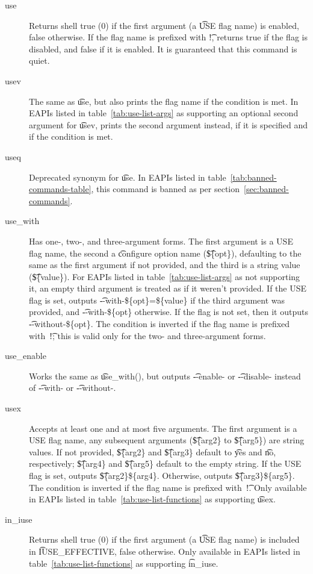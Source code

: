 \begin{description}
\item[use] Returns shell true (0) if the first argument (a \t{USE} flag name) is enabled, false
    otherwise.  If the flag name is prefixed with \t{!}, returns true if the flag is disabled, and
    false if it is enabled. It is guaranteed that this command is quiet.
\item[usev]  The same as \t{use}, but also prints the flag name if the condition
    is met. In EAPIs listed in table~\ref{tab:use-list-args} as supporting an optional second
    argument for \t{usev}, prints the second argument instead, if it is specified and if the
    condition is met.
\item[useq] Deprecated synonym for \t{use}.
    In EAPIs listed in table~\ref{tab:banned-commands-table}, this command is banned as per
    section~\ref{sec:banned-commands}.
\item[use_with]  Has one-, two-, and three-argument forms. The first
    argument is a USE flag name, the second a \t{configure} option name (\t{\$\{opt\}}), defaulting
    to the same as the first argument if not provided, and the third is a string value
    (\t{\$\{value\}}). For EAPIs listed in table~\ref{tab:use-list-args} as not supporting it,
    an empty third argument is treated as if it weren't provided. If the USE flag is set, outputs
    \t{-{}-with-\$\{opt\}=\$\{value\}} if the third argument was provided, and
    \t{-{}-with-\$\{opt\}} otherwise. If the flag is not set, then it outputs
    \t{-{}-without-\$\{opt\}}. The condition is inverted if the flag name is prefixed with~\t{!};
    this is valid only for the two- and three-argument forms.
\item[use_enable] Works the same as \t{use_with()}, but outputs \t{-{}-enable-} or
    \t{-{}-disable-} instead of \t{-{}-with-} or \t{-{}-without-}.
\item[usex]  Accepts at least one and at most five arguments. The first argument
    is a USE flag name, any subsequent arguments (\t{\$\{arg2\}} to \t{\$\{arg5\}}) are string
    values. If not provided, \t{\$\{arg2\}} and \t{\$\{arg3\}} default to \t{yes} and \t{no},
    respectively; \t{\$\{arg4\}} and \t{\$\{arg5\}} default to the empty string. If the USE flag is
    set, outputs \t{\$\{arg2\}\$\{arg4\}}. Otherwise, outputs \t{\$\{arg3\}\$\{arg5\}}.
    The condition is inverted if the flag name is prefixed with~\t{!}.
    Only available in EAPIs listed in table~\ref{tab:use-list-functions} as supporting \t{usex}.
\item[in_iuse]  Returns shell true (0) if the first argument (a \t{USE} flag
    name) is included in \t{IUSE_EFFECTIVE}, false otherwise. Only available in EAPIs listed in
    table~\ref{tab:use-list-functions} as supporting \t{in_iuse}.
\end{description}

